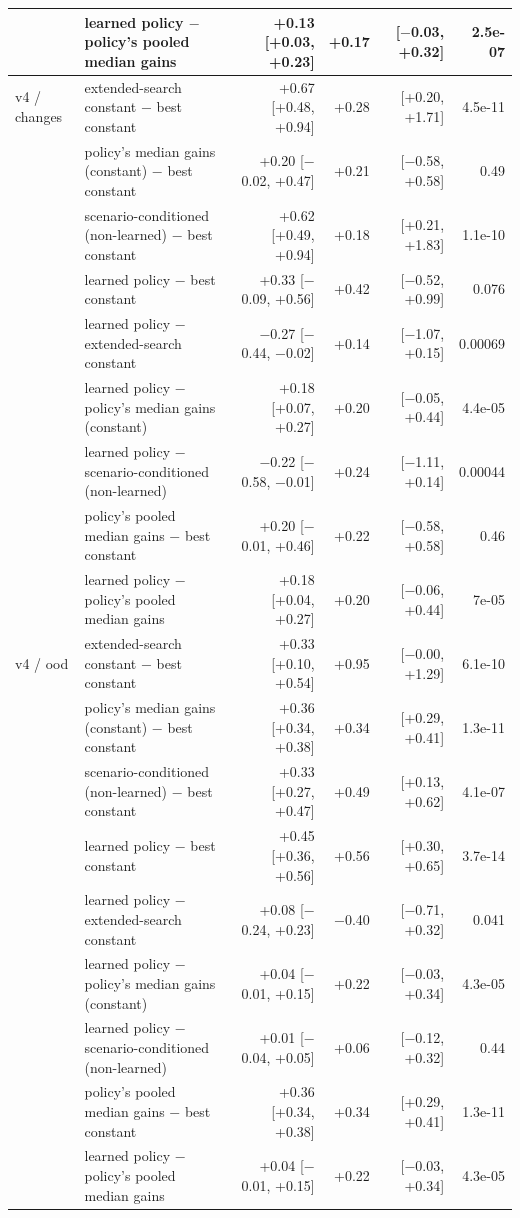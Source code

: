 \begin{table}[t]
\begin{tabular}{llrrrr}
 & learned policy $-$ policy's pooled median gains & +0.13 [+0.03, +0.23] & +0.17 & [$-$0.03, +0.32] & 2.5e-07\\
\midrule
v4 / changes & extended-search constant $-$ best constant & +0.67 [+0.48, +0.94] & +0.28 & [+0.20, +1.71] & 4.5e-11\\
 & policy's median gains (constant) $-$ best constant & +0.20 [$-$0.02, +0.47] & +0.21 & [$-$0.58, +0.58] & 0.49\\
 & scenario-conditioned (non-learned) $-$ best constant & +0.62 [+0.49, +0.94] & +0.18 & [+0.21, +1.83] & 1.1e-10\\
 & learned policy $-$ best constant & +0.33 [$-$0.09, +0.56] & +0.42 & [$-$0.52, +0.99] & 0.076\\
 & learned policy $-$ extended-search constant & $-$0.27 [$-$0.44, $-$0.02] & +0.14 & [$-$1.07, +0.15] & 0.00069\\
 & learned policy $-$ policy's median gains (constant) & +0.18 [+0.07, +0.27] & +0.20 & [$-$0.05, +0.44] & 4.4e-05\\
 & learned policy $-$ scenario-conditioned (non-learned) & $-$0.22 [$-$0.58, $-$0.01] & +0.24 & [$-$1.11, +0.14] & 0.00044\\
 & policy's pooled median gains $-$ best constant & +0.20 [$-$0.01, +0.46] & +0.22 & [$-$0.58, +0.58] & 0.46\\
 & learned policy $-$ policy's pooled median gains & +0.18 [+0.04, +0.27] & +0.20 & [$-$0.06, +0.44] & 7e-05\\
\midrule
v4 / ood & extended-search constant $-$ best constant & +0.33 [+0.10, +0.54] & +0.95 & [$-$0.00, +1.29] & 6.1e-10\\
 & policy's median gains (constant) $-$ best constant & +0.36 [+0.34, +0.38] & +0.34 & [+0.29, +0.41] & 1.3e-11\\
 & scenario-conditioned (non-learned) $-$ best constant & +0.33 [+0.27, +0.47] & +0.49 & [+0.13, +0.62] & 4.1e-07\\
 & learned policy $-$ best constant & +0.45 [+0.36, +0.56] & +0.56 & [+0.30, +0.65] & 3.7e-14\\
 & learned policy $-$ extended-search constant & +0.08 [$-$0.24, +0.23] & $-$0.40 & [$-$0.71, +0.32] & 0.041\\
 & learned policy $-$ policy's median gains (constant) & +0.04 [$-$0.01, +0.15] & +0.22 & [$-$0.03, +0.34] & 4.3e-05\\
 & learned policy $-$ scenario-conditioned (non-learned) & +0.01 [$-$0.04, +0.05] & +0.06 & [$-$0.12, +0.32] & 0.44\\
 & policy's pooled median gains $-$ best constant & +0.36 [+0.34, +0.38] & +0.34 & [+0.29, +0.41] & 1.3e-11\\
 & learned policy $-$ policy's pooled median gains & +0.04 [$-$0.01, +0.15] & +0.22 & [$-$0.03, +0.34] & 4.3e-05\\
\bottomrule
\end{tabular}
\end{table}
